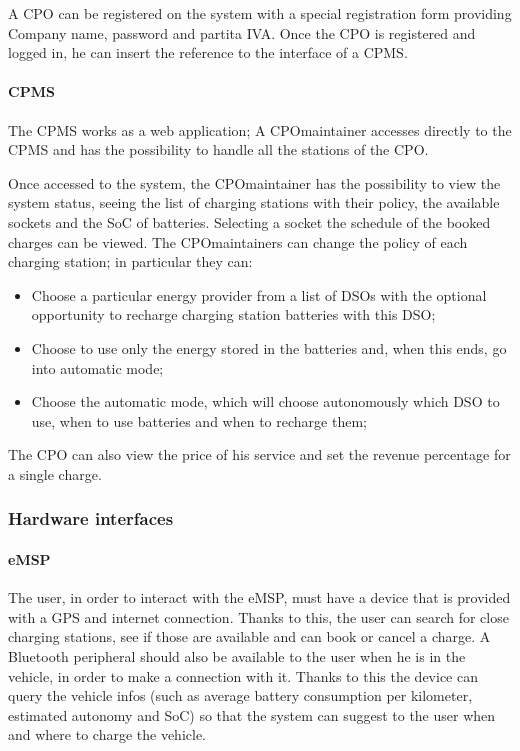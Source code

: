 A \ac{CPO} can be registered on the system with a special registration form providing Company name, password and partita IVA. Once the \ac{CPO} is registered and logged in, he can insert the reference to the interface of a \ac{CPMS}.


\paragraph{\ac{CPMS}}
The \ac{CPMS} works as a web application; A \ac{CPO}maintainer accesses directly to the \ac{CPMS} and has the possibility to handle all the stations of the \ac{CPO}.

Once accessed to the system, the \ac{CPO}maintainer has the possibility to view the system status, seeing the list of charging stations with their policy, the available sockets and the \ac{SoC} of batteries. Selecting a socket the schedule of the booked charges can be viewed.
The \ac{CPO}maintainers can change the policy of each charging station; in particular they can:
\begin{itemize}
    \item Choose a particular energy provider from a list of \acp{DSO} with the optional opportunity to recharge charging station batteries with this \ac{DSO};
    \item Choose to use only the energy stored in the batteries and, when this ends, go into automatic mode;
    \item Choose the automatic mode, which will choose autonomously which \ac{DSO} to use, when to use batteries and when to recharge them;
\end{itemize}

The \ac{CPO} can also view the price of his service and set the revenue percentage for a single charge.

\subsubsection{Hardware interfaces}
\paragraph{\ac{eMSP}}
The user, in order to interact with the \ac{eMSP}, must have a device that is provided with a \ac{GPS} and internet connection. Thanks to this, the user can search for close charging stations, see if those are available and can book or cancel a charge.
A Bluetooth peripheral should also be available to the user when he is in the vehicle, in order to make a connection with it. Thanks to this the device can query the vehicle infos (such as average battery consumption per kilometer, estimated autonomy and \ac{SoC}) so that the system can suggest to the user when and where to charge the vehicle.

